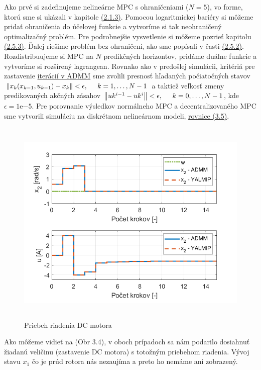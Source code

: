 Ako prvé si zadefinujeme nelineárne MPC s ohraničeniami ($N = 5$), vo forme, ktorú sme si ukázali v kapitole  \hyperref[subse:NelinearneMPC]{(2.1.3)}. Pomocou logaritmickej bariéry si môžeme pridať ohraničenia do účelovej funkcie a vytvoríme si tak neohraničený optimalizačný problém. Pre podrobnejšie vysvetlenie si môžeme pozrieť kapitolu \hyperref[subse:Ohranicenia]{(2.5.3)}. Ďalej riešime problém bez ohraničení, ako sme popísali v časti \hyperref[subse:Nelin_MPC_ADMM]{(2.5.2)}. Rozdistribuujeme si MPC na $N$ predikčných horizontov, pridáme duálne funkcie a vytvoríme si rozšírený lagrangean. Rovnako ako v predošlej simulácii, kritériá pre zastavenie \hyperref[subse:ADMM2]{iterácií v ADMM} sme zvolili presnosť hľadaných počiatočných stavov $\left\lVert x_{k}(x_{k-1},u_{k-1})- x_{k}\right\rVert < \epsilon,\hspace{0.5cm} k=1,\dots,N-1$ a taktiež veľkosť zmeny predikovaných akčných zásahov $\left\lVert u{k}^{i-1}-u{k}^{i}\right\rVert < \epsilon,\hspace{0.5cm} k=0,\dots,N-1$, kde $\epsilon = 1\mathrm{e}{-5}$. Pre porovnanie výsledkov normálneho MPC a decentralizovaného MPC sme vytvorili simuláciu na diskrétnom nelineárnom modeli, \hyperref[math:model_DC]{rovnice (3.5)}.
\begin{figure}[H]
	\centering
	\includegraphics[width=13cm,height=10cm]{images/DC_motor/Priebeh_riadenia_a_akcne_zasahy}
	\caption{Priebeh riadenia DC motora}
	\label{fig7: PR}
\end{figure}
Ako môžeme vidieť na (Obr 3.4), v oboch prípadoch sa nám podarilo dosiahnuť žiadanú veličinu (zastavenie DC motora) s totožným priebehom riadenia. Vývoj stavu $x_{1}$ čo je prúd rotora nás nezaujíma a preto ho nemáme ani zobrazený.
